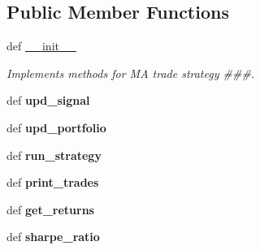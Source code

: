 \subsection*{\-Public \-Member \-Functions}
\begin{DoxyCompactItemize}
\item 
def \hyperlink{classstrategy__tester_1_1TradeStrategyClasses_1_1Pairs__Trade_a994d657abf51b72421b9540b0984f1fe}{\-\_\-\-\_\-init\-\_\-\-\_\-}
\begin{DoxyCompactList}\small\item\em \-Implements methods for \-M\-A trade strategy \#\#\#. \end{DoxyCompactList}\item 
\hypertarget{classstrategy__tester_1_1TradeStrategyClasses_1_1Pairs__Trade_a1c41c7d723cdb672bc0cebd56e060132}{def {\bfseries upd\-\_\-signal}}\label{classstrategy__tester_1_1TradeStrategyClasses_1_1Pairs__Trade_a1c41c7d723cdb672bc0cebd56e060132}

\item 
\hypertarget{classstrategy__tester_1_1TradeStrategyClasses_1_1Pairs__Trade_a883ba0a472c9c7c817640f345ef833da}{def {\bfseries upd\-\_\-portfolio}}\label{classstrategy__tester_1_1TradeStrategyClasses_1_1Pairs__Trade_a883ba0a472c9c7c817640f345ef833da}

\item 
\hypertarget{classstrategy__tester_1_1TradeStrategyClasses_1_1Pairs__Trade_a831060c80e16cf4ac29c9264417ab309}{def {\bfseries run\-\_\-strategy}}\label{classstrategy__tester_1_1TradeStrategyClasses_1_1Pairs__Trade_a831060c80e16cf4ac29c9264417ab309}

\item 
\hypertarget{classstrategy__tester_1_1TradeStrategyClasses_1_1Pairs__Trade_a71d80f46274cca4d6f645c2d6ec92e15}{def {\bfseries print\-\_\-trades}}\label{classstrategy__tester_1_1TradeStrategyClasses_1_1Pairs__Trade_a71d80f46274cca4d6f645c2d6ec92e15}

\item 
\hypertarget{classstrategy__tester_1_1TradeStrategyClasses_1_1Pairs__Trade_a39942477936e3071eaef34e6012cc4ad}{def {\bfseries get\-\_\-returns}}\label{classstrategy__tester_1_1TradeStrategyClasses_1_1Pairs__Trade_a39942477936e3071eaef34e6012cc4ad}

\item 
\hypertarget{classstrategy__tester_1_1TradeStrategyClasses_1_1Pairs__Trade_a55c285d92f0c2224f4a0e4e9e65fd9a9}{def {\bfseries sharpe\-\_\-ratio}}\label{classstrategy__tester_1_1TradeStrategyClasses_1_1Pairs__Trade_a55c285d92f0c2224f4a0e4e9e65fd9a9}


\end{DoxyCompactItemize}
